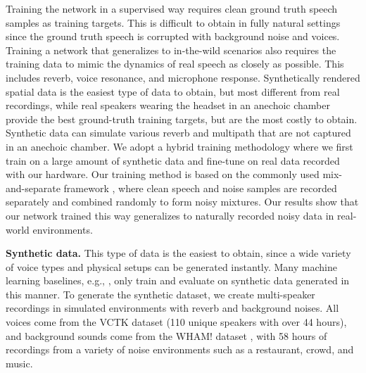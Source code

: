 \documentclass [11pt, proquest] {uwthesis}[2020/02/24]
\begin{document}
Training the network in a supervised way requires clean ground truth speech samples as training targets. This is difficult to obtain in fully natural settings since the ground truth speech is corrupted with background noise and voices. Training a network that generalizes to in-the-wild scenarios also requires the training data to mimic the dynamics of real speech as closely as possible. This includes reverb, voice resonance, and microphone response. Synthetically rendered spatial data is the easiest type of data to obtain, but most different from real recordings, while real speakers wearing the headset in an anechoic chamber provide the best ground-truth training targets, but are the most costly to obtain. Synthetic data can simulate various reverb and multipath that are not captured in an anechoic chamber. We adopt a hybrid training methodology where we first train on a large amount of synthetic data and fine-tune on real data recorded with our hardware. Our training method is based on the commonly used mix-and-separate framework \cite{zhao2018sound}, where clean speech and noise samples are recorded separately and combined randomly to form noisy mixtures. Our  results  show that our network trained this way generalizes to naturally recorded noisy data in  real-world environments.

{\bf Synthetic data.}  This type of data is the easiest to obtain, since a wide variety of voice types and physical setups can be generated instantly. Many machine learning baselines, e.g., \cite{luo2020endtoend, jenrungrot2020cone, tzirakis2021multichannel}, only train and evaluate on synthetic data generated in this manner. To generate the synthetic dataset, we create multi-speaker recordings in simulated environments with reverb and background noises. All voices come from the VCTK dataset \cite{vctk} (110 unique speakers with over 44 hours), and background sounds come from the WHAM! dataset \cite{wham}, with 58 hours of recordings from a variety of noise environments such as a restaurant,  crowd,  and music.
\end{document}
